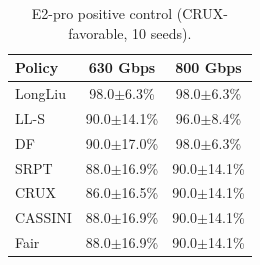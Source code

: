 \begin{table}[t]
\centering
\caption{E2-pro positive control (CRUX-favorable, 10 seeds).}
\label{tab:e2pro}
\small\begin{tabular}{lcc}\toprule
Policy & 630 Gbps & 800 Gbps \\\midrule
LongLiu & 98.0$\pm$6.3\% & 98.0$\pm$6.3\% \\
LL-S & 90.0$\pm$14.1\% & 96.0$\pm$8.4\% \\
DF & 90.0$\pm$17.0\% & 98.0$\pm$6.3\% \\
SRPT & 88.0$\pm$16.9\% & 90.0$\pm$14.1\% \\
CRUX & 86.0$\pm$16.5\% & 90.0$\pm$14.1\% \\
CASSINI & 88.0$\pm$16.9\% & 90.0$\pm$14.1\% \\
Fair & 88.0$\pm$16.9\% & 90.0$\pm$14.1\% \\
\bottomrule\end{tabular}\end{table}
